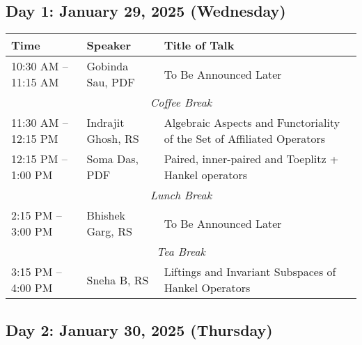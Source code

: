 %
%

\subsection*{Day 1: January 29, 2025 (Wednesday)}

\noindent
\renewcommand{\arraystretch}{1.5} %
\begin{tabular}{|p{3.5cm}|p{4cm}|p{7cm}|}
	\hline
	\textbf{Time} & \textbf{Speaker} & \textbf{Title of Talk} \\
	\hline
	10:30 AM -- 11:15 AM & Gobinda Sau, PDF & To Be Announced Later \\
	\hline
	\multicolumn{3}{|c|}{\textit{Coffee Break}} \\
	\hline
    11:30 AM -- 12:15 PM & Indrajit Ghosh, RS & Algebraic Aspects and Functoriality of the Set of Affiliated Operators \\
	\hline
	12:15 PM -- 1:00 PM & Soma Das, PDF & Paired, inner-paired and Toeplitz + Hankel operators \\
	\hline
	\multicolumn{3}{|c|}{\textit{Lunch Break}} \\
	\hline
	2:15 PM -- 3:00 PM & Bhishek Garg, RS & To Be Announced Later \\
	\hline
	\multicolumn{3}{|c|}{\textit{Tea Break}} \\
	\hline
	3:15 PM -- 4:00 PM & Sneha B, RS & Liftings and Invariant Subspaces of Hankel Operators\\
	\hline

\end{tabular}


\subsection*{Day 2: January 30, 2025 (Thursday)}

